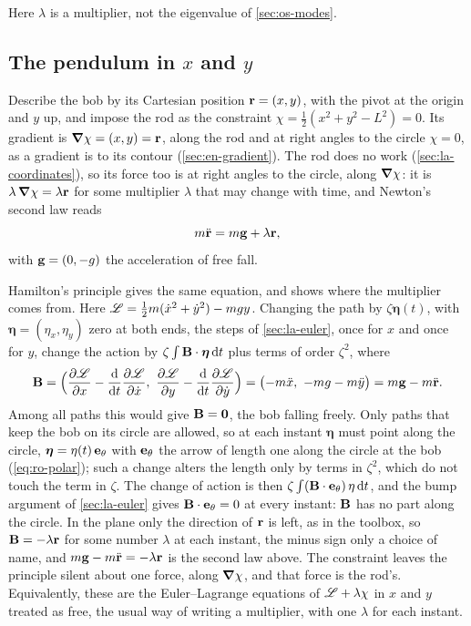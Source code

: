 Here $\lambda$ is a multiplier, not the eigenvalue of \cref{sec:os-modes}.

\subsection*{The pendulum in $x$ and $y$}

Describe the bob by its Cartesian position $\bm{\mathrm{r}} = (x, y)$, with the
pivot at the origin and $y$ up, and impose the rod as the constraint $\chi
= \frac12(x^2 + y^2 - L^2) = 0$. Its gradient is $\bm{\nabla}\chi = (x, y) =
\bm{\mathrm{r}}$, along the rod and at right angles to the circle $\chi = 0$, as a
gradient is to its contour (\cref{sec:en-gradient}). The rod does no work
(\cref{sec:la-coordinates}), so its force too is at right angles to the
circle, along $\bm{\nabla}\chi$: it is $\lambda\,\bm{\nabla}\chi = \lambda\bm{\mathrm{r}}$ for
some multiplier $\lambda$ that may change with time, and Newton's second
law reads
\begin{equation*}
   m\ddot{\bm{\mathrm{r}}} = m\bm{\mathrm{g}} + \lambda\bm{\mathrm{r}} ,
\end{equation*}
with $\bm{\mathrm{g}} = (0, -g)$ the acceleration of free fall.

Hamilton's principle gives the same equation, and shows where the
multiplier comes from. Here $\mathscr{L} = \frac12 m(\dot{x}^2 + \dot{y}^2) -
mgy$. Changing the path by $\zeta\boldsymbol{\eta}(t)$, with
$\boldsymbol{\eta} = (\eta_x, \eta_y)$ zero at both ends, the steps of
\cref{sec:la-euler}, once for $x$ and once for $y$, change the action by
$\zeta\int\bm{\mathrm{B}}\cdot\boldsymbol{\eta}\,\mathrm{d} t$ plus terms of order
$\zeta^2$, where
\begin{equation*}
   \bm{\mathrm{B}} = \Bigl(\frac{\partial\mathscr{L}}{\partial x}
   - \frac{\mathrm{d}}{\mathrm{d} t}\frac{\partial\mathscr{L}}{\partial\dot{x}},\
   \frac{\partial\mathscr{L}}{\partial y}
   - \frac{\mathrm{d}}{\mathrm{d} t}\frac{\partial\mathscr{L}}{\partial\dot{y}}\Bigr)
   = \bigl(-m\ddot{x},\ -mg - m\ddot{y}\bigr)
   = m\bm{\mathrm{g}} - m\ddot{\bm{\mathrm{r}}} .
\end{equation*}
Among all paths this would give $\bm{\mathrm{B}} = \bm{\mathrm{0}}$, the bob falling freely.
Only paths that keep the bob on its circle are allowed, so at each instant
$\boldsymbol{\eta}$ must point along the circle, $\boldsymbol{\eta} =
\eta(t)\,\bm{\mathrm{e}}_\theta$ with $\bm{\mathrm{e}}_\theta$ the arrow of length one along
the circle at the bob (\cref{eq:ro-polar}); such a change alters the length only by terms in $\zeta^2$, which
do not touch the term in $\zeta$. The change of action is then
$\zeta\int(\bm{\mathrm{B}}\cdot\bm{\mathrm{e}}_\theta)\,\eta\,\mathrm{d} t$, and the bump argument
of \cref{sec:la-euler} gives $\bm{\mathrm{B}}\cdot\bm{\mathrm{e}}_\theta = 0$ at every
instant:
$\bm{\mathrm{B}}$ has no part along the circle. In the plane only the direction of
$\bm{\mathrm{r}}$ is left, as in the toolbox, so $\bm{\mathrm{B}} = -\lambda\bm{\mathrm{r}}$ for some
number $\lambda$ at each instant, the minus sign only a choice of name,
and $m\bm{\mathrm{g}} - m\ddot{\bm{\mathrm{r}}} = -\lambda\bm{\mathrm{r}}$ is the second law above.
The constraint leaves the principle silent about one force, along
$\bm{\nabla}\chi$, and that force is the rod's. Equivalently, these are the
Euler--Lagrange equations of $\mathscr{L} + \lambda\chi$ in $x$ and $y$ treated
as free, the usual way of writing a multiplier, with one $\lambda$ for
each instant.


